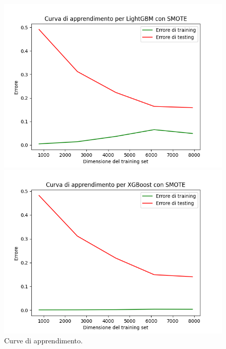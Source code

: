 \begin{figure}[H]
    \begin{minipage}[b]{0.45\linewidth}
      \centering
      \includegraphics[scale=0.5]{img/learning_curve_LightGBM_SMOTE.png}
      
    \end{minipage}
    \hfill
    \begin{minipage}[b]{0.45\linewidth}
      \centering
      \includegraphics[scale=0.5]{img/learning_curve_XGBoost_SMOTE.png}
      
    \end{minipage}
    \caption{Curve di apprendimento.}
    
    \end{figure}

